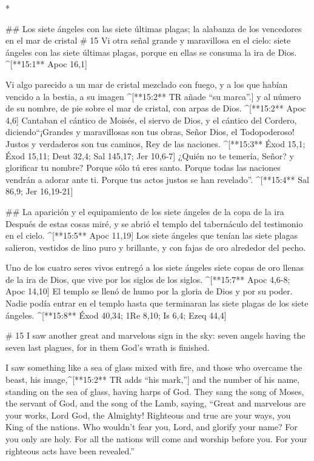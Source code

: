 \begin{paracols}{2}
\begin{english}
\end{english}
\switchcolumn[0]*

## Los siete ángeles con las siete últimas plagas; la alabanza de los vencedores en el mar de cristal
# 15
 Vi otra señal grande y maravillosa en el cielo: siete ángeles con las siete últimas plagas, porque en ellas se consuma la ira de Dios. ^[**15:1** Apoc 16,1]

 Vi algo parecido a un mar de cristal mezclado con fuego, y a los que habían vencido a la bestia, a su imagen ^[**15:2** TR añade “su marca”.] y al número de su nombre, de pie sobre el mar de cristal, con arpas de Dios. ^[**15:2** Apoc 4,6]  Cantaban el cántico de Moisés, el siervo de Dios, y el cántico del Cordero, diciendo“¡Grandes y maravillosas son tus obras, Señor Dios, el Todopoderoso! Justos y verdaderos son tus caminos, Rey de las naciones. ^[**15:3** Éxod 15,1; Éxod 15,11; Deut 32,4; Sal 145,17; Jer 10,6-7]  ¿Quién no te temería, Señor? y glorificar tu nombre? Porque sólo tú eres santo. Porque todas las naciones vendrán a adorar ante ti. Porque tus actos justos se han revelado”. ^[**15:4** Sal 86,9; Jer 16,19-21]

## La aparición y el equipamiento de los siete ángeles de la copa de la ira
 Después de estas cosas miré, y se abrió el templo del tabernáculo del testimonio en el cielo. ^[**15:5** Apoc 11,19]  Los siete ángeles que tenían las siete plagas salieron, vestidos de lino puro y brillante, y con fajas de oro alrededor del pecho.

 Uno de los cuatro seres vivos entregó a los siete ángeles siete copas de oro llenas de la ira de Dios, que vive por los siglos de los siglos. ^[**15:7** Apoc 4,6-8; Apoc 14,10]  El templo se llenó de humo por la gloria de Dios y por su poder. Nadie podía entrar en el templo hasta que terminaran las siete plagas de los siete ángeles. ^[**15:8** Éxod 40,34; 1Re 8,10; Is 6,4; Ezeq 44,4]

\switchcolumn
\begin{english}

# 15
 I saw another great and marvelous sign in the sky: seven angels having the seven last plagues, for in them God’s wrath is finished. 

 I saw something like a sea of glass mixed with fire, and those who overcame the beast, his image,^[**15:2** TR adds “his mark,”] and the number of his name, standing on the sea of glass, having harps of God.  They sang the song of Moses, the servant of God, and the song of the Lamb, saying, “Great and marvelous are your works, Lord God, the Almighty! Righteous and true are your ways, you King of the nations.  Who wouldn’t fear you, Lord, and glorify your name? For you only are holy. For all the nations will come and worship before you. For your righteous acts have been revealed.” 


\end{english}
\end{paracols}
